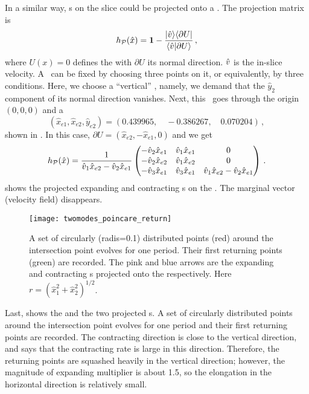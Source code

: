 In a similar way, \Fv s on
the slice could be
projected onto a {\PoincSec}. The projection matrix is
\[
  h_{\mathcal{P}}(\sspRed) = \matId -
  \frac{\ket{\hat{\vel}}\bra{\partial U}}{\braket{\hat{\vel}}{\partial U}}
  \,,
\]
where $U(x) = 0$ defines the {\PoincSec} with $\partial U$ its normal direction.
$\hat{v}$ is the in-slice velocity.
A \PoincSec\ can be fixed by choosing three points on it, or equivalently,
by three conditions. Here, we choose a ``vertical'' \PoincSec, namely, we demand
that the
$\hat{y}_2$ component of its normal direction vanishes. Next, this \PoincSec\
goes through the origin $(0,0,0)$ and a \reqv\
\[
  (\hat{x}_{e1}, \hat{x}_{e2},
  \hat{y}_{e2})=(0.439965,\quad -0.386267, \quad 0.070204)
  \,,
\]
shown in .
In this case, $\partial U=(\hat{x}_{e2},- \hat{x}_{e1}, 0)$ and we get
\[
  h_{\mathcal{P}}(\hat{x})
  =\frac{1}{\hat{v}_{1}\hat{x}_{e2}-\hat{v}_{2}\hat{x}_{e1}}
  \begin{pmatrix}
    -\hat{v}_{2}\hat{x}_{e1} & \hat{v}_{1}\hat{x}_{e1} & 0 \\
    -\hat{v}_{2}\hat{x}_{e2} & \hat{v}_{1}\hat{x}_{e2} & 0 \\
    -\hat{v}_{3}\hat{x}_{e1} & \hat{v}_{3}\hat{x}_{e1} &
    \hat{v}_{1}\hat{x}_{e2}-\hat{v}_{2}\hat{x}_{e1}\\
  \end{pmatrix}
  \,.
\]
 shows the projected
expanding and contracting \Fv s
on the {\PoincSec}. The marginal vector (velocity field)
disappears.

\begin{figure}[h]
  \centering
  \texttt{[image: twomodes\_poincare\_return]}
  \caption[First returning points on the {\PoincSec} in
  the \twomode\ system]{
    A set of circularly (radis=0.1) distributed points (red)
    around the intersection
    point evolves for one period.
    Their first returning points (green) are recorded.
    The pink and blue arrows are the expanding
    and contracting
    \Fv s projected onto the {\PoincSec} respectively.
    Here $r=(\hat{x}_{1}^2+\hat{x}_{2}^2)^{1/2}$.
  }
  \label{fig:twomodes_poincare_return}
\end{figure}

Last,  shows the
{\PoincSec} and the
two projected \Fv s. A set of
circularly distributed points around
the intersection point  evolves for one period
and their first returning points are
recorded.
The contracting direction is close to the vertical direction,
and  says that the contracting rate is large
in this direction. Therefore,
the returning points are squashed heavily in the
vertical direction; however, the magnitude of expanding multiplier is
about 1.5, so the elongation in the horizontal direction is relatively
small.

